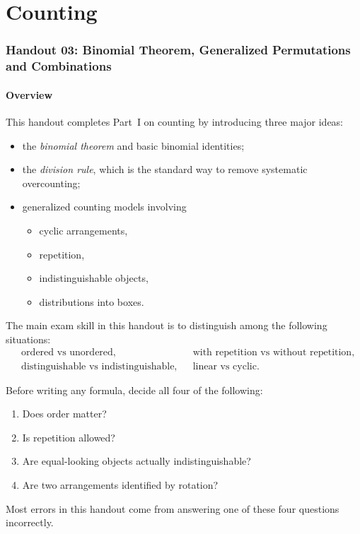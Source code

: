 \part{Counting}
\section{Handout 03: Binomial Theorem, Generalized Permutations and Combinations}

\subsection{Overview}

This handout completes Part~I on counting by introducing three major ideas:
\begin{itemize}[leftmargin=*]
    \item the \emph{binomial theorem} and basic binomial identities;
    \item the \emph{division rule}, which is the standard way to remove systematic overcounting;
    \item generalized counting models involving
    \begin{itemize}[leftmargin=*]
        \item cyclic arrangements,
        \item repetition,
        \item indistinguishable objects,
        \item distributions into boxes.
    \end{itemize}
\end{itemize}

The main exam skill in this handout is to distinguish among the following situations:
\[
\begin{aligned}
&\text{ordered vs unordered}, &&
\text{with repetition vs without repetition},\\
&\text{distinguishable vs indistinguishable}, &&
\text{linear vs cyclic}.
\end{aligned}
\]

\begin{examtip}[title={Main modelling checklist for Handout 03}]
Before writing any formula, decide all four of the following:
\begin{enumerate}[leftmargin=*]
    \item Does order matter?
    \item Is repetition allowed?
    \item Are equal-looking objects actually indistinguishable?
    \item Are two arrangements identified by rotation?
\end{enumerate}
Most errors in this handout come from answering one of these four questions incorrectly.
\end{examtip}

